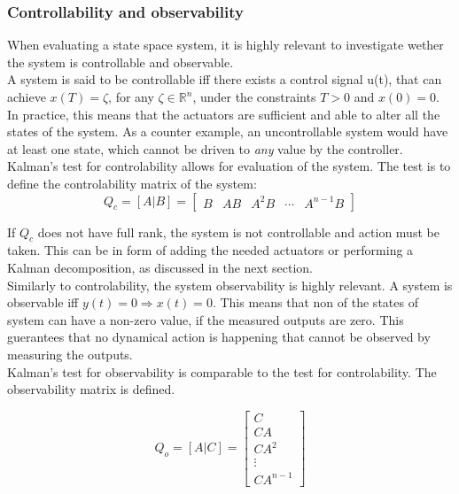 \subsubsection{Controllability and observability}
When evaluating a state space system, it is highly relevant to investigate wether the system is controllable and observable. \\
A system is said to be controllable iff there exists a control signal u(t), that can achieve $x(T) = \zeta$, for any $\zeta \in \mathbb{R} ^{n}$, under the constraints $T>0$ and $x(0)=0$. In practice, this means that the actuators are sufficient and able to alter all the states of the system. As a counter example, an uncontrollable system would have at least one state, which cannot be driven to \textit{any} value by the controller.\\
Kalman's test for controlability allows for evaluation of the system. The test is to define the controlability matrix of the system:
\begin{equation}
	Q_c = [A|B] = \begin{bmatrix}
		B & AB & A^2B & \cdots & A^{n-1}B
	\end{bmatrix}
\end{equation}

If $Q_c$ does not have full rank, the system is not controllable and action must be taken. This can be in form of adding the needed actuators or performing a Kalman decomposition, as discussed in the next section.\\

Similarly to controlability, the system observability is highly relevant. A system is observable iff $y(t)=0 \Rightarrow x(t)=0$. This means that non of the states of system can have a non-zero value, if the measured outputs are zero. This guerantees that no dynamical action is happening that cannot be observed by measuring the outputs.\\

Kalman's test for observability is comparable to the test for controlability. The observability matrix is defined.

\begin{equation}
	Q_o = [A|C] = \begin{bmatrix}
		C \\ CA \\ CA^2 \\ \vdots \\ CA^{n-1}
	\end{bmatrix}
\end{equation}

